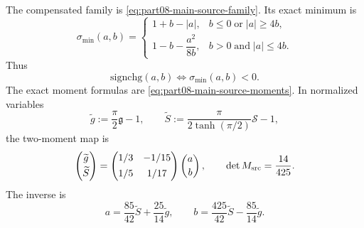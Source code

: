 The compensated family is \cref{eq:part08-main-source-family}.  Its exact minimum is
\begin{equation}
\label{eq:part08-stage246-sigma-min}
\sigma_{\min}(a,b)=
\begin{cases}
1+b-|a|, & b\le0\;\text{or}\; |a|\ge4b,\\[4pt]
1-b-\dfrac{a^2}{8b}, & b>0\;\text{and}\; |a|\le4b.
\end{cases}
\end{equation}
Thus
\begin{equation}
\label{eq:part08-stage246-sign-change}
\mathrm{signchg}(a,b)\iff \sigma_{\min}(a,b)<0.
\end{equation}
The exact moment formulas are \cref{eq:part08-main-source-moments}.  In normalized variables
\begin{equation}
\label{eq:part08-stage246-normalized-source-moments}
\widetilde g:=\frac\pi2\mathfrak g-1,
\qquad
\widetilde S:=\frac{\pi}{2\tanh(\pi/2)}\mathcal S-1,
\end{equation}
the two-moment map is
\begin{equation}
\label{eq:part08-stage246-matrix}
\begin{pmatrix}
\widetilde g\\[2pt]
\widetilde S
\end{pmatrix}
=
\begin{pmatrix}
1/3 & -1/15\\[4pt]
1/5 & 1/17
\end{pmatrix}
\begin{pmatrix}
a\\[2pt]
b
\end{pmatrix},
\qquad
\det M_{\rm src}=\frac{14}{425}.
\end{equation}
The inverse is
\begin{equation}
\label{eq:part08-stage246-inverse-source-map}
a=\frac{85}{42}\widetilde S+\frac{25}{14}\widetilde g,
\qquad
b=\frac{425}{42}\widetilde S-\frac{85}{14}\widetilde g.
\end{equation}


